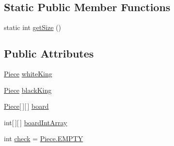 \subsection*{Static Public Member Functions}
\begin{DoxyCompactItemize}
\item 
static int \hyperlink{classgame_1_1_board_ad08736b75fde9ed768c7842759b442f8}{get\-Size} ()
\end{DoxyCompactItemize}
\subsection*{Public Attributes}
\begin{DoxyCompactItemize}
\item 
\hyperlink{classpieces_1_1_piece}{Piece} \hyperlink{classgame_1_1_board_ae468c82687902428871a19693c923c15}{white\-King}
\item 
\hyperlink{classpieces_1_1_piece}{Piece} \hyperlink{classgame_1_1_board_a3208a9b2a809f279c2f33f2f87a9a68c}{black\-King}
\item 
\hyperlink{classpieces_1_1_piece}{Piece}\mbox{[}$\,$\mbox{]}\mbox{[}$\,$\mbox{]} \hyperlink{classgame_1_1_board_a7b235a9a7c1dbfd5373366fe8bd2c4e2}{board}
\item 
int\mbox{[}$\,$\mbox{]}\mbox{[}$\,$\mbox{]} \hyperlink{classgame_1_1_board_aef78af0593e283d51122b0aff9e98d3e}{board\-Int\-Array}
\item 
int \hyperlink{classgame_1_1_board_acd643578da78ae9b61cbc0b962d03bc7}{check} = \hyperlink{classpieces_1_1_piece_a5d79a14b2b47d6699449dd3e015f0392}{Piece.\-E\-M\-P\-T\-Y}
\end{DoxyCompactItemize}
